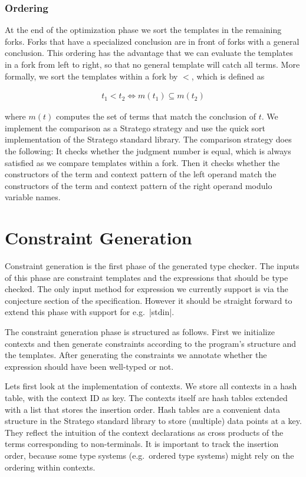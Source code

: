 \subsubsection{Ordering}
At the end of the optimization phase we sort the templates in the
remaining forks. Forks that have a specialized conclusion are in front
of forks with a general conclusion. This ordering has the advantage
that we can evaluate the templates in a fork from left to right, so
that no general template will catch all terms. More formally, we sort
the templates within a fork by $<$, which is defined as

\begin{align}
  t_1 < t_2 \iff m(t_1) \subseteq m(t_2)
\end{align}

where $m(t)$ computes the set of terms that match the conclusion of
$t$. We implement the comparison as a Stratego strategy and use the
quick sort implementation of the Stratego standard library. The
comparison strategy does the following: It checks whether the judgment
number is equal, which is always satisfied as we compare templates
within a fork. Then it checks whether the constructors of the term and
context pattern of the left operand match the constructors of the term
and context pattern of the right operand modulo variable names.

\section{Constraint Generation}
\label{sec:constr-gener}
Constraint generation is the first phase of the generated type
checker. The inputs of this phase are constraint templates and the
expressions that should be type checked. The only input method for
expression we currently support is via the conjecture section of the
specification. However it should be straight forward to extend this
phase with support for e.g.\ \code|stdin|.

The constraint generation phase is structured as follows. First we
initialize contexts and then generate constraints according to the
program's structure and the templates. After generating the constraints
we annotate whether the expression should have been well-typed or not.

Lets first look at the implementation of contexts. We store all
contexts in a hash table, with the context ID as key. The contexts
itself are hash tables extended with a list that stores the insertion
order. Hash tables are a convenient data structure in the Stratego
standard library to store (multiple) data points at a key. They
reflect the intuition of the context declarations as cross products of
the terms corresponding to non-terminals. It is important to track the
insertion order, because some type systems (e.g.\ ordered type
systems) might rely on the ordering within contexts.

